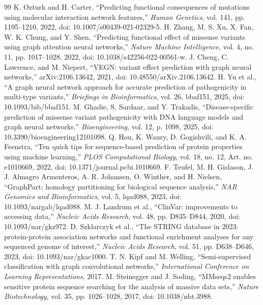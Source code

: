 \documentclass[conference]{IEEEtran}
\begin{document}
\begin{thebibliography}{99}
 K. Ozturk and H. Carter, ``Predicting functional consequences of mutations using molecular interaction network features,'' \emph{Human Genetics}, vol. 141, pp. 1195--1210, 2022, doi: 10.1007/s00439-021-02329-5.
 H. Zhang, M. S. Xu, X. Fan, W. K. Chung, and Y. Shen, ``Predicting functional effect of missense variants using graph attention neural networks,'' \emph{Nature Machine Intelligence}, vol. 4, no. 11, pp. 1017--1028, 2022, doi: 10.1038/s42256-022-00561-w.
 J. Cheng, C. Lawrence, and M. Niepert, ``VEGN: variant effect prediction with graph neural networks,'' arXiv:2106.13642, 2021, doi: 10.48550/arXiv.2106.13642.
 H. Yu et al., ``A graph neural network approach for accurate prediction of pathogenicity in multi-type variants,'' \emph{Briefings in Bioinformatics}, vol. 26, bbaf151, 2025, doi: 10.1093/bib/bbaf151.
 M. Ghadie, S. Sardaar, and Y. Trakadis, ``Disease-specific prediction of missense variant pathogenicity with DNA language models and graph neural networks,'' \emph{Bioengineering}, vol. 12, p. 1098, 2025, doi: 10.3390/bioengineering12101098.
 Q. Hou, K. Waury, D. Gogishvili, and K. A. Feenstra, ``Ten quick tips for sequence-based prediction of protein properties using machine learning,'' \emph{PLOS Computational Biology}, vol. 18, no. 12, Art. no. e1010669, 2022, doi: 10.1371/journal.pcbi.1010669.
 F. Teufel, M. H. Gislason, J. J. Almagro Armenteros, A. R. Johansen, O. Winther, and H. Nielsen, ``GraphPart: homology partitioning for biological sequence analysis,'' \emph{NAR Genomics and Bioinformatics}, vol. 5, lqad088, 2023, doi: 10.1093/nargab/lqad088.
 M. J. Landrum et al., ``ClinVar: improvements to accessing data,'' \emph{Nucleic Acids Research}, vol. 48, pp. D835--D844, 2020, doi: 10.1093/nar/gkz972.
 D. Szklarczyk et al., ``The STRING database in 2023: protein-protein association networks and functional enrichment analyses for any sequenced genome of interest,'' \emph{Nucleic Acids Research}, vol. 51, pp. D638--D646, 2023, doi: 10.1093/nar/gkac1000.
 T. N. Kipf and M. Welling, ``Semi-supervised classification with graph convolutional networks,'' \emph{International Conference on Learning Representations}, 2017.
 M. Steinegger and J. Soding, ``MMseqs2 enables sensitive protein sequence searching for the analysis of massive data sets,'' \emph{Nature Biotechnology}, vol. 35, pp. 1026--1028, 2017, doi: 10.1038/nbt.3988.

\end{thebibliography}
\end{document}
